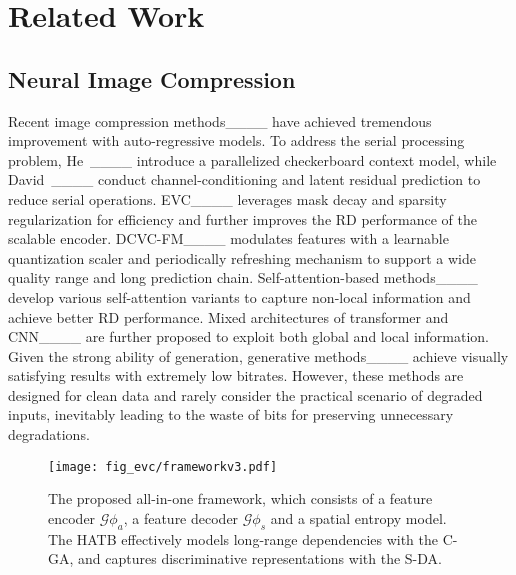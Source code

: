\section{Related Work}
\label{sec:related}\vspace{-0.05in}
 \subsection{Neural Image Compression}\vspace{-0.05in}
Recent image compression methods____ have achieved tremendous improvement with auto-regressive models.
 To address the serial processing problem, He~\etal____ introduce a parallelized checkerboard context model, while David~\etal____ conduct channel-conditioning and latent residual prediction to reduce serial operations. EVC____ leverages mask decay and sparsity regularization for efficiency and further improves the RD performance of the scalable encoder. 
 DCVC-FM____ modulates features with a learnable quantization scaler and periodically refreshing mechanism to support a wide quality range and long prediction chain. Self-attention-based methods____ develop various self-attention variants to capture non-local information and achieve better RD performance. Mixed architectures of transformer and CNN____ are further proposed to exploit both global and local information.  Given the strong ability of generation, generative methods____ achieve visually satisfying results with extremely low bitrates. However, these methods are designed for clean data and rarely consider the practical scenario of degraded inputs, inevitably leading to the waste of bits for preserving unnecessary degradations.  
 
  
 \begin{figure*}[t]
\centering
\vspace{-4pt}\texttt{[image: fig\_evc/frameworkv3.pdf]}\vspace{-6pt}
\caption{The proposed all-in-one framework, which consists of a feature encoder $\mathcal{G}{\phi_a}$, a feature decoder $\mathcal{G}{\phi_s}$ and a spatial entropy model. The HATB effectively models long-range dependencies with the C-GA, and captures discriminative representations with the S-DA.  }\vspace{-0.15in}  
\label{fig:overview}
\end{figure*}


